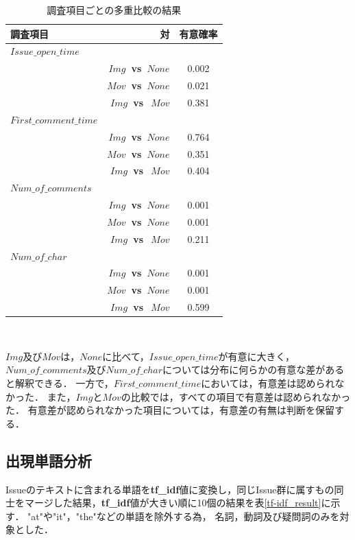 \begin{table}[t]
  \begin{center}
  \caption{調査項目ごとの多重比較の結果}
  \begin{tabular}{l r|c}
    \hline
    調査項目 & 対 & 有意確率 \\
    \hline \hline
    $Issue\_open\_time$ & & \\
     & \bf{$Img$~vs~$None$} & 0.002 \\
     & \bf{$Mov$~vs~$None$} & 0.021 \\
     & \bf{$Img$~vs~$~Mov$} & 0.381 \\
    \hline
    $First\_comment\_time$ & & \\
     & \bf{$Img$~vs~$None$} & 0.764 \\
     & \bf{$Mov$~vs~$None$} & 0.351 \\
     & \bf{$Img$~vs~$~Mov$} & 0.404 \\
    \hline
    $Num\_of\_comments$ & & \\
     & \bf{$Img$~vs~$None$} & 0.001 \\
     & \bf{$Mov$~vs~$None$} & 0.001 \\
     & \bf{$Img$~vs~$~Mov$} & 0.211 \\
    \hline
    $Num\_of\_char$ & & \\
     & \bf{$Img$~vs~$None$} & 0.001 \\
     & \bf{$Mov$~vs~$None$} & 0.001 \\
     & \bf{$Img$~vs~$~Mov$} & 0.599 \\
    \hline
  \end{tabular}\\
  \label{Steel-Dwass_result}
  \end{center}
\end{table}

$Img$及び$Mov$は，$None$に比べて，$Issue\_open\_time$が有意に大きく，
$Num\_of\_comments$及び$Num\_of\_char$については分布に何らかの有意な差があると解釈できる．
一方で，$First\_comment\_time$においては，有意差は認められなかった．
また，$Img$と$Mov$の比較では，すべての項目で有意差は認められなかった．
有意差が認められなかった項目については，有意差の有無は判断を保留する．

\subsection{出現単語分析}
Issueのテキストに含まれる単語を\textbf{tf\_idf}値に変換し，同じIssue群に属すもの同士をマージした結果，\textbf{tf\_idf}値が大きい順に10個の結果を表\ref{tf-idf_result}に示す．
"at"や"it"，"the"などの単語を除外する為，
名詞，動詞及び疑問詞のみを対象とした． \\

